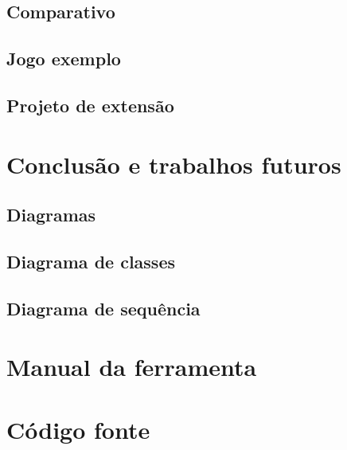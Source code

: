 \documentclass[12pt,twoside,openright,a4paper,english,brazil,sumario=tradicional]{abntex2}
\begin{document}
\section{Comparativo}
\section{Jogo exemplo}
\section{Projeto de extensão}

\chapter{Conclusão e trabalhos futuros}
\label{chap:conclcsao}

\begin{apendicesenv}
\partapendices
\chapter{Diagramas}
\label{chap:diagramas}

\section{Diagrama de classes}


\section{Diagrama de sequência}

\end{apendicesenv}

\begin{anexosenv}
\partanexos
\chapter{Manual da ferramenta}

\chapter{Código fonte}
\end{anexosenv}
\printindex
\end{document}

